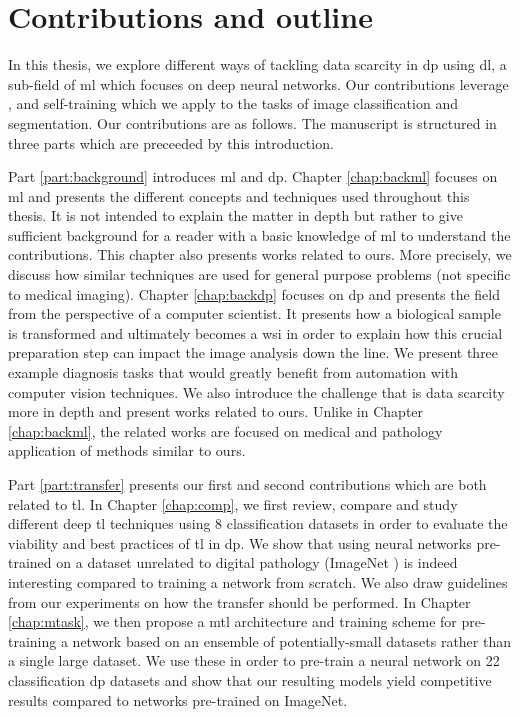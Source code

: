 \section{Contributions and outline}

In this thesis, we explore different ways of tackling data scarcity in \acrlong{dp} using \acrlong{dl}, a sub-field of \acrlong{ml} which focuses on deep neural networks. Our contributions leverage ,  and self-training which we apply to the tasks of image classification and segmentation. Our contributions are as follows. The manuscript is structured in three parts which are preceeded by this introduction.

Part \ref{part:background} introduces \acrlong{ml} and \acrlong{dp}. Chapter \ref{chap:backml} focuses on \acrlong{ml} and presents the different concepts and techniques used throughout this thesis. It is not intended to explain the matter in depth but rather to give sufficient background for a reader with a basic knowledge of \acrlong{ml} to understand the contributions. This chapter also presents works related to ours. More precisely, we discuss how similar techniques are used for general purpose problems (\ie not specific to medical imaging). Chapter \ref{chap:backdp} focuses on \acrlong{dp} and presents the field from the perspective of a computer scientist. It presents how a biological sample is transformed and ultimately becomes a \acrlong{wsi} in order to explain how this crucial preparation step can impact the image analysis down the line. We present three example diagnosis tasks that would greatly benefit from automation with computer vision techniques. We also introduce the challenge that is data scarcity more in depth and present works related to ours. Unlike in Chapter \ref{chap:backml}, the related works are focused on medical and pathology application of methods similar to ours.

Part \ref{part:transfer} presents our first and second contributions which are both related to \acrlong{tl}. In Chapter \ref{chap:comp}, we first review, compare and study different deep \acrlong{tl} techniques using 8 classification datasets in order to evaluate the viability and best practices of \acrlong{tl} in \acrlong{dp}. We show that using neural networks pre-trained on a dataset unrelated to digital pathology (\ie ImageNet \parencite{deng2009imagenet}) is indeed interesting compared to training a network from scratch. We also draw guidelines from our experiments on how the transfer should be performed. In Chapter \ref{chap:mtask}, we then propose a \acrlong{mtl} architecture and training scheme for pre-training a network based on an ensemble of potentially-small datasets rather than a single large dataset. We use these in order to pre-train a neural network on 22 classification \acrlong{dp} datasets and show that our resulting models yield competitive results compared to networks pre-trained on ImageNet. 

